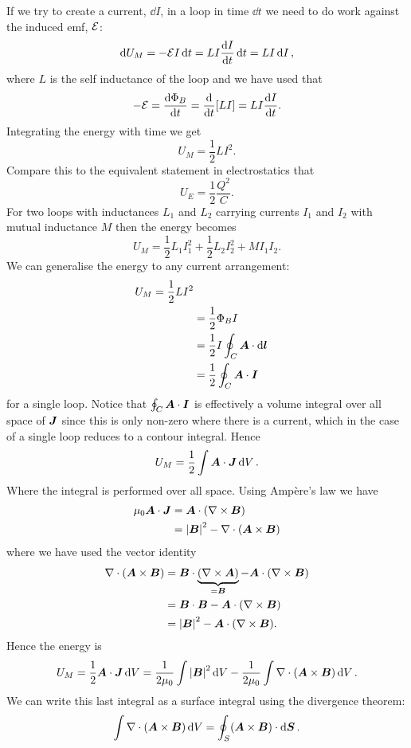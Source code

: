     If we try to create a current, \(\dd{I}\), in a loop in time \(\dd{t}\) we need to do work against the induced \gls{emf}, \(\mathcal{E}\):
    \[\dd{U_M} = -\mathcal{E} I\dd{t} = LI\dv{I}{t}\dd{t} = LI\dd{I},\]
    where \(L\) is the self inductance of the loop and we have used that
    \[-\mathcal{E} = \dv{\Phi_B}{t} = \dv{t}[LI] = LI\dv{I}{t}.\]
    Integrating the energy with time we get
    \[U_M = \frac{1}{2}LI^2.\]
    Compare this to the equivalent statement in electrostatics that
    \[U_E = \frac{1}{2}\frac{Q^2}{C}.\]
    For two loops with inductances \(L_1\) and \(L_2\) carrying currents \(I_1\) and \(I_2\) with mutual inductance \(M\) then the energy becomes
    \[U_M = \frac{1}{2}L_1I_1^2 + \frac{1}{2}L_2I_2^2 + MI_1I_2.\]
    We can generalise the energy to any current arrangement:
    \begin{align*}
        U_M = \frac{1}{2}LI^2\\
        &= \frac{1}{2}\Phi_BI\\
        &= \frac{1}{2}I\oint_C \bm{A}\cdot\dd{\bm{l}}\\
        &= \frac{1}{2}\oint_C \bm{A}\cdot\bm{I}
    \end{align*}
    for a single loop.
    Notice that \(\oint_C \bm{A}\cdot\bm{I}\) is effectively a volume integral over all space of \(\bm{J}\) since this is only non-zero where there is a current, which in the case of a single loop reduces to a contour integral.
    Hence
    \[U_M = \frac{1}{2}\int\bm{A}\cdot\bm{J}\dd{V}.\]
    Where the integral is performed over all space.
    Using Amp\`ere's law we have
    \begin{align*}
        \mu_0\bm{A}\cdot\bm{J} &= \bm{A}\cdot(\nabla\times\bm{B})\\
        &= \abs{\bm{B}}^2 - \nabla\cdot(\bm{A}\times\bm{B})
    \end{align*}
    where we have used the vector identity
    \begin{align*}
        \nabla\cdot(\bm{A}\times\bm{B}) &= \bm{B}\cdot\underbrace{(\nabla\times\bm{A})}_{=\bm{B}} - \bm{A}\cdot(\nabla\times\bm{B})\\
        &= \bm{B}\cdot\bm{B} - \bm{A}\cdot(\nabla\times\bm{B})\\
        &= \abs{\bm{B}}^2 - \bm{A}\cdot(\nabla\times\bm{B}).
    \end{align*}
    Hence the energy is
    \[U_M = \frac{1}{2}\bm{A}\cdot\bm{J}\dd{V} = \frac{1}{2\mu_0}\int\abs{\bm{B}}^2\dd{V} - \frac{1}{2\mu_0}\int\nabla\cdot(\bm{A}\times\bm{B})\dd{V}.\]
    We can write this last integral as a surface integral using the divergence theorem:
    \[\int\nabla\cdot(\bm{A}\times\bm{B})\dd{V} = \oint_S(\bm{A}\times\bm{B})\cdot\dd{\bm{S}}.\]
